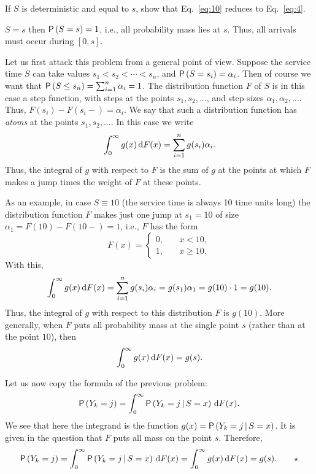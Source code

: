 \begin{exercise}
  If $S$ is deterministic and equal to $s$, show that
  Eq.~\eqref{eq:10} reduces to Eq.~\eqref{eq:4}.  
  \begin{hint}
 $S=s$ then
    $\P{S=s}=1$, i.e., all probability mass lies at $s$. Thus, all
    arrivals must occur during $[0,s]$.
  \end{hint}
  \begin{solution}
    Let us first attack this problem from a general point of
    view. Suppose the service time $S$ can take values
    $s_1<s_2<\cdots <s_n$, and $\P{S=s_i}=\alpha_i$. Then of course we
    want that $\P{S\leq s_n} = \sum_{i=1}^n \alpha_i = 1$. The
    distribution function $F$ of $S$ is in this case a step function,
    with steps at the points $s_1, s_2, \ldots$, and step sizes
    $\alpha_1, \alpha_2, \ldots$. Thus, $F(s_i)-F(s_i-)=\alpha_i$. We
    say that such a distribution function has \emph{atoms} at the
    points $s_1, s_2, \ldots$. In this case we write
  \begin{equation*}
    \int_0^\infty g(x) \,\text{d}F(x) = \sum_{i=1}^n g(s_i) \alpha_i.
  \end{equation*}
  Thus, the integral of $g$ with respect to $F$ is the sum of $g$ at
  the points at which $F$ makes a jump times the weight of $F$ at
  these points. 

  As an example, in case $S\equiv 10$ (the service time is always 10
  time units long) the distribution function $F$ makes just one jump
  at $s_1=10$ of size $\alpha_1 = F(10)-F(10-) =1$, i.e., $F$ has the
  form
    \begin{equation*}
      F(x) = 
      \begin{cases}
        0, &\quad x< 10, \\
        1, &\quad x\geq 10.
      \end{cases}
    \end{equation*}
With this, 
\begin{equation*}
  \int_0^\infty g(x) \,\text{d}F(x) = \sum_{i=1}^n g(s_i) \alpha_i = g(s_1) \alpha_1 = g(10) \cdot 1 = g(10).
\end{equation*}
Thus, the integral of $g$ with respect to this distribution $F$ is
$g(10)$.  More generally, when $F$ puts all probability mass at the
single point $s$ (rather than at the point $10$), then
\begin{equation*}
  \int_0^\infty g(x) \,\text{d}F(x) = g(s).
\end{equation*}

    Let us now copy the formula of the previous problem:
    \begin{equation*}
    \P{Y_k=j} = \int_0^\infty \P{Y_k =j\given S=x} \d F(x).
    \end{equation*}
    We see that here the integrand is the function
    $g(x) = \P{Y_k=j\given S=x}$. It is given in the question that $F$
    puts all mass on the point $s$. Therefore,
    \begin{equation*}
    \P{Y_k=j} = \int_0^\infty \P{Y_k =j\given S=x} \d F(x) = 
\int_0^\infty g(x) \d F(x) = g(s). \qquad \star
    \end{equation*}


\end{solution}
\end{exercise}
